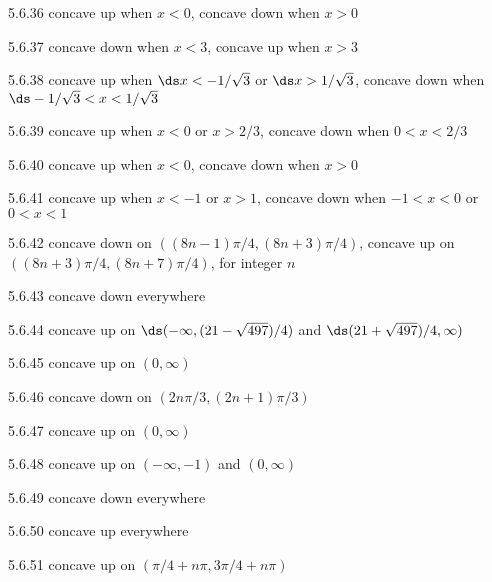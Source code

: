 \begin{Answer}{5.6.36}
 concave up when $x<0$, concave down when $x>0$
\end{Answer}
\begin{Answer}{5.6.37}
 concave down when $x<3$, concave up when $x>3$
\end{Answer}
\begin{Answer}{5.6.38}
 concave up when $\ds x<-1/\sqrt3$ or $\ds x>1/\sqrt3$,
concave down when $\ds -1/\sqrt3<x<1/\sqrt3$
\end{Answer}
\begin{Answer}{5.6.39}
 concave up when $x<0$ or $x>2/3$,
concave down when $0<x<2/3$
\end{Answer}
\begin{Answer}{5.6.40}
 concave up when $x<0$, concave down when $x>0$
\end{Answer}
\begin{Answer}{5.6.41}
 concave up when $x<-1$ or $x>1$, concave down when
$-1<x<0$ or $0<x<1$
\end{Answer}
\begin{Answer}{5.6.42}
 concave down on $((8n-1)\pi/4,(8n+3)\pi/4)$,
concave up on $((8n+3)\pi/4,(8n+7)\pi/4)$, for integer $n$
\end{Answer}
\begin{Answer}{5.6.43}
 concave down everywhere
\end{Answer}
\begin{Answer}{5.6.44}
 concave up on $\ds (-\infty,(21-\sqrt{497})/4)$ and
$\ds (21+\sqrt{497})/4,\infty)$
\end{Answer}
\begin{Answer}{5.6.45}
 concave up on $(0,\infty)$
\end{Answer}
\begin{Answer}{5.6.46}
 concave down on $(2n\pi/3,(2n+1)\pi/3)$
\end{Answer}
\begin{Answer}{5.6.47}
 concave up on $(0,\infty)$
\end{Answer}
\begin{Answer}{5.6.48}
 concave up on $(-\infty,-1)$ and $(0,\infty)$
\end{Answer}
\begin{Answer}{5.6.49}
 concave down everywhere
\end{Answer}
\begin{Answer}{5.6.50}
 concave up everywhere
\end{Answer}
\begin{Answer}{5.6.51}
 concave up on $(\pi/4+n\pi,3\pi/4+n\pi)$
\end{Answer}
